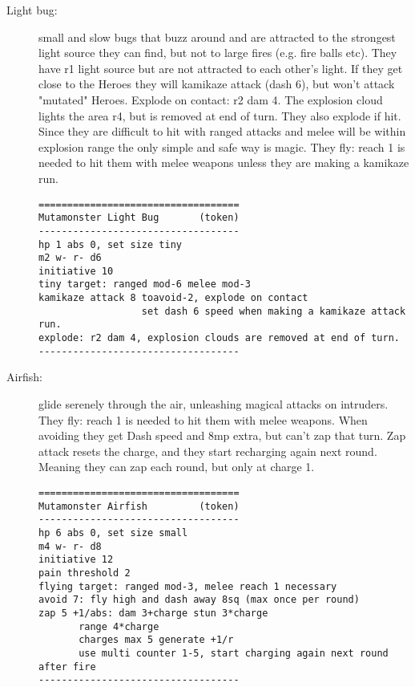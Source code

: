 \begin{description}

\item[Light bug:] small and slow bugs that buzz around and are attracted to the strongest light source they can find, but not to large fires (e.g. fire balls etc). They have r1 light source but are not attracted to each other's light. If they get close to the Heroes they will kamikaze attack (dash 6), but won't attack "mutated" Heroes. Explode on contact: r2 dam 4. The explosion cloud lights the area r4, but is removed at end of turn.
They also explode if hit. Since they are difficult to hit with ranged attacks and melee will be within explosion range the only simple and safe way is magic.
They fly: reach 1 is needed to hit them with melee weapons unless they are making a kamikaze run.
\goodbreak \begin{samepage} \small \begin{verbatim}
===================================
Mutamonster Light Bug       (token)
-----------------------------------
hp 1 abs 0, set size tiny
m2 w- r- d6
initiative 10
tiny target: ranged mod-6 melee mod-3
kamikaze attack 8 toavoid-2, explode on contact
                  set dash 6 speed when making a kamikaze attack run.
explode: r2 dam 4, explosion clouds are removed at end of turn.
-----------------------------------
\end{verbatim} \normalsize \end{samepage}

\item[Airfish:] glide serenely through the air, unleashing magical attacks on intruders. They fly: reach 1 is needed to hit them with melee weapons.
When avoiding they get Dash speed and 8mp extra, but can't zap that turn.
Zap attack resets the charge, and they start recharging again next round. Meaning they can zap each round, but only at charge 1.
\goodbreak \begin{samepage} \small \begin{verbatim}
===================================
Mutamonster Airfish         (token)
-----------------------------------
hp 6 abs 0, set size small
m4 w- r- d8
initiative 12
pain threshold 2
flying target: ranged mod-3, melee reach 1 necessary
avoid 7: fly high and dash away 8sq (max once per round)
zap 5 +1/abs: dam 3+charge stun 3*charge
       range 4*charge
       charges max 5 generate +1/r
       use multi counter 1-5, start charging again next round after fire
-----------------------------------
\end{verbatim} \normalsize \end{samepage}


\end{description}
